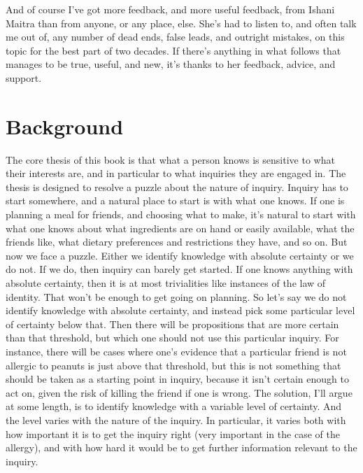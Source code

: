 \documentclass[
  11pt,
]{book}
\renewcommand{\headrulewidth}{0pt}
\renewcommand{\footrulewidth}{0pt}
\renewcommand{\headrulewidth}{0pt}
\begin{document}
And of course I've got more feedback, and more useful feedback, from Ishani Maitra than from anyone, or any place, else. She's had to listen to, and often talk me out of, any number of dead ends, false leads, and outright mistakes, on this topic for the best part of two decades. If there's anything in what follows that manages to be true, useful, and new, it's thanks to her feedback, advice, and support.

\hypertarget{background}{%
\chapter{Background}\label{background}}

\fancyhf{}
\fancyhead[C]{\textit \leftmark}
\fancyhead[R]{\thepage}
\fancyfoot{}
\renewcommand{\headrulewidth}{0pt}
\renewcommand{\footrulewidth}{0pt}
\addtolength{\headheight}{1.6pt}
\fancypagestyle{plain}{
  \fancyhead{}
  \renewcommand{\headrulewidth}{0pt}
}

The core thesis of this book is that what a person knows is sensitive to what their interests are, and in particular to what inquiries they are engaged in. The thesis is designed to resolve a puzzle about the nature of inquiry. Inquiry has to start somewhere, and a natural place to start is with what one knows. If one is planning a meal for friends, and choosing what to make, it's natural to start with what one knows about what ingredients are on hand or easily available, what the friends like, what dietary preferences and restrictions they have, and so on. But now we face a puzzle. Either we identify knowledge with absolute certainty or we do not. If we do, then inquiry can barely get started. If one knows anything with absolute certainty, then it is at most trivialities like instances of the law of identity. That won't be enough to get going on planning. So let's say we do not identify knowledge with absolute certainty, and instead pick some particular level of certainty below that. Then there will be propositions that are more certain than that threshold, but which one should not use this particular inquiry. For instance, there will be cases where one's evidence that a particular friend is not allergic to peanuts is just above that threshold, but this is not something that should be taken as a starting point in inquiry, because it isn't certain enough to act on, given the risk of killing the friend if one is wrong. The solution, I'll argue at some length, is to identify knowledge with a variable level of certainty. And the level varies with the nature of the inquiry. In particular, it varies both with how important it is to get the inquiry right (very important in the case of the allergy), and with how hard it would be to get further information relevant to the inquiry.
\end{document}
